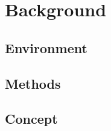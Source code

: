 
\chapter{Background} \label{chap:Background}
\minitoc\vspace{1em}


\section{Environment} \label{sec:Environment}


\section{Methods} \label{sec:Methods}


\section{Concept} \label{sec:Concept}


% 
% 
% 